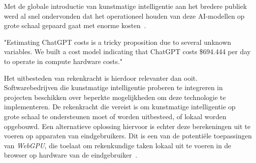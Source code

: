 
Met de globale introductie van kunstmatige intelligentie aan het bredere publiek werd al snel ondervonden dat het operationeel houden van deze AI-modellen op grote schaal gepaard gaat met enorme kosten~\autocite{Patel2023}.

\begin{displayquote}
    "Estimating ChatGPT costs is a tricky proposition due to several unknown variables. We built a cost model indicating that ChatGPT costs \$694.444 per day to operate in compute hardware costs."
\end{displayquote}

Het uitbesteden van rekenkracht is hierdoor relevanter dan ooit. Softwarebedrijven die kunstmatige intelligentie proberen te integreren in projecten beschikken over beperkte mogelijkheden om deze technologie te implementeren. De rekenkracht die vereist is om kunstmatige intelligentie op grote schaal te ondersteunen moet of worden uitbesteed, of lokaal worden opgebouwd. Een alternatieve oplossing hiervoor is echter deze berekeningen uit te voeren op apparaten van eindgebruikers. Dit is een van de potentiële toepassingen van \textit{WebGPU}, die toelaat om rekenkundige taken lokaal uit te voeren in de browser op hardware van de eindgebruiker~\autocite{Wallez2023}.

\section{}%
\label{sec:onderzoeksvraag}


